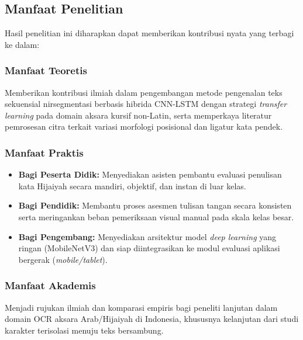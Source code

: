 \documentclass[conference]{IEEEtran}
\begin{document}
\subsection{Manfaat Penelitian}
Hasil penelitian ini diharapkan dapat memberikan kontribusi nyata yang terbagi ke dalam:
\subsubsection{Manfaat Teoretis}
Memberikan kontribusi ilmiah dalam pengembangan metode pengenalan teks sekuensial nirsegmentasi berbasis hibrida CNN-LSTM dengan strategi \textit{transfer learning} pada domain aksara kursif non-Latin, serta memperkaya literatur pemrosesan citra terkait variasi morfologi posisional dan ligatur kata pendek.

\subsubsection{Manfaat Praktis}
\begin{itemize}
    \item \textbf{Bagi Peserta Didik:} Menyediakan asisten pembantu evaluasi penulisan kata Hijaiyah secara mandiri, objektif, dan instan di luar kelas.
    \item \textbf{Bagi Pendidik:} Membantu proses asesmen tulisan tangan secara konsisten serta meringankan beban pemeriksaan visual manual pada skala kelas besar.
    \item \textbf{Bagi Pengembang:} Menyediakan arsitektur model \textit{deep learning} yang ringan (MobileNetV3) dan siap diintegrasikan ke modul evaluasi aplikasi bergerak (\textit{mobile/tablet}).
\end{itemize}

\subsubsection{Manfaat Akademis}
Menjadi rujukan ilmiah dan komparasi empiris bagi peneliti lanjutan dalam domain OCR aksara Arab/Hijaiyah di Indonesia, khususnya kelanjutan dari studi karakter terisolasi menuju teks bersambung.
\end{document}

